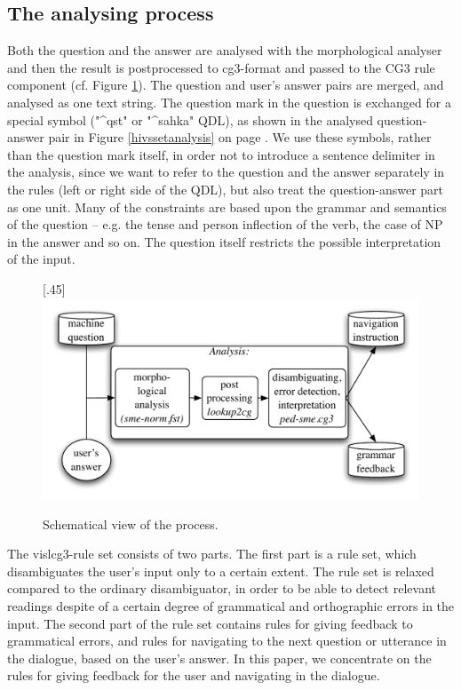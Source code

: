 \documentclass[11pt]{article}
\begin{document}
\subsection{The analysing process} 
Both the question and the answer are analysed with the morphological analyser and then the result is postprocessed to cg3-format and passed to the CG3 rule component (cf. Figure \ref{nounlex}). The question and user's answer pairs are merged, and analysed as one text string. The question mark in the question is exchanged for a special symbol ("\^{}qst" or "\^{}sahka" QDL), as shown in the analysed question-answer pair in Figure \ref{hivssetanalysis} on page \pageref{hivssetanalysis}. We use these symbols, rather than the question mark itself, in order not to introduce a sentence delimiter in the analysis, since we want to refer to the question and the answer separately in the rules (left or right side of the QDL), but also treat the question-answer part as one unit. Many of the constraints are based upon the grammar and semantics of the question -- e.g. the tense and person inflection of the verb, the case of NP in the answer and so on. The question itself restricts the possible interpretation of the input. \\

\begin{figure}[htbp]
\begin{center}
\scalebox{.45}[.45]{\includegraphics{presentation/img/qa2.pdf}}\\
\caption{Schematical view of the process.}
\label{nounlex}
\end{center}
\end{figure}



The vislcg3-rule set consists of two parts. The first part is a rule set, which disambiguates the user's input only to a certain extent. The rule set is relaxed compared to the ordinary disambiguator, in order to be able to detect relevant readings despite of a certain degree of grammatical and orthographic errors in the input. The second part of the rule set contains rules for giving feedback to grammatical errors, and rules for navigating to the next question or utterance in the dialogue, based on the user's answer.  In this paper, we concentrate on the rules for giving feedback for the user and navigating in the dialogue.
\end{document}
